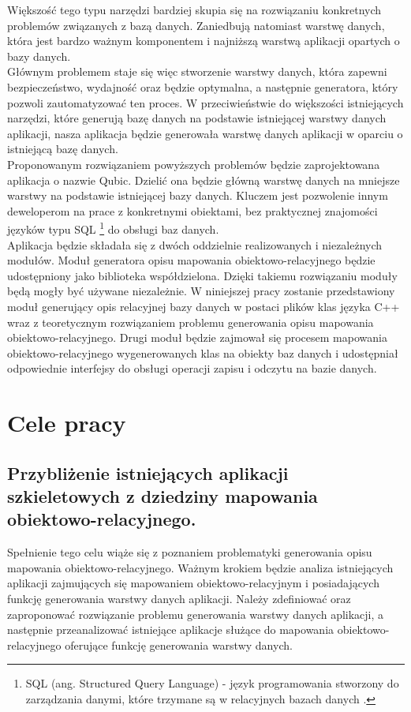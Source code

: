 \documentclass[12pt]{report}
\begin{document}
Większość tego typu narzędzi bardziej skupia się na rozwiązaniu konkretnych problemów związanych z bazą danych. Zaniedbują natomiast warstwę danych,
która jest bardzo ważnym komponentem i najniższą warstwą aplikacji opartych o bazy danych. \\
	\indent Głównym problemem staje się więc stworzenie warstwy danych, która zapewni bezpieczeństwo, wydajność oraz będzie optymalna, a następnie generatora, który pozwoli zautomatyzować ten proces. W przeciwieństwie do większości istniejących narzędzi, które generują bazę danych na podstawie istniejącej warstwy danych aplikacji,
nasza aplikacja będzie generowała warstwę danych aplikacji w oparciu o istniejącą bazę danych. \\
	\indent Proponowanym rozwiązaniem powyższych problemów będzie zaprojektowana aplikacja o nazwie Qubic. Dzielić ona będzie główną warstwę danych
na mniejsze warstwy na podstawie istniejącej bazy danych. Kluczem jest pozwolenie innym deweloperom na prace z konkretnymi obiektami, bez praktycznej znajomości
języków typu SQL
	\footnote{SQL (ang. Structured Query Language) - język programowania stworzony do zarządzania danymi, które trzymane są w relacyjnych bazach danych \cite{sql}.} 
 do obsługi baz danych. \\
	\indent Aplikacja będzie składała się z dwóch oddzielnie realizowanych i niezależnych modułów.
Moduł generatora opisu mapowania obiektowo-relacyjnego będzie udostępniony jako biblioteka współdzielona.
Dzięki takiemu rozwiązaniu moduły będą mogły być używane niezależnie.
W niniejszej pracy zostanie przedstawiony moduł generujący opis 
relacyjnej bazy danych w postaci plików klas języka C++ wraz z teoretycznym rozwiązaniem problemu generowania opisu mapowania obiek\-towo-relacyjnego.
Drugi moduł będzie zajmował się procesem mapowania 
obiektowo-relacyjnego wygenerowanych klas na obiekty baz danych i udostępniał
odpowiednie interfejsy do obsługi operacji  zapisu i odczytu na bazie danych.

\section{Cele pracy}
\subsection{Przybliżenie istniejących aplikacji szkieletowych z dziedziny mapowania obiektowo-relacyjnego.}
Spełnienie tego celu wiąże się z poznaniem problematyki generowania opisu mapowania obiektowo-relacyjnego. Ważnym krokiem będzie analiza istniejących aplikacji zajmujących się
mapowaniem obiektowo-relacyjnym i posiadających funkcję generowania warstwy danych aplikacji. Należy zdefiniować oraz zaproponować rozwiązanie problemu generowania warstwy danych aplikacji, a następnie przeanalizować istniejące aplikacje służące do mapowania obiektowo-relacyjnego oferujące funkcję generowania warstwy danych.
\end{document}
